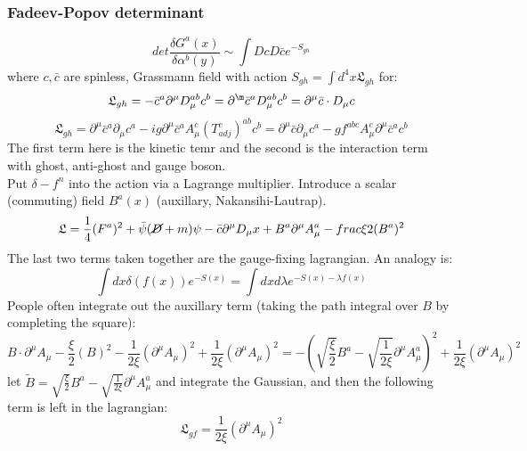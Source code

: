 \documentclass{article}
\begin{document}
       \subsubsection{Fadeev-Popov determinant}
       $$
        det \frac{\delta G^a (x)}{\delta \alpha^b(y)} \sim \int D c D \bar c e^{- S_{gh}}
       $$
       where $c, \bar c$ are spinless, Grassmann field with action $S_{gh} = \int d^4 x \mathfrak{L}_{gh}$ for:
       $$
        \mathfrak{L}_{gh} = - \bar c^a \partial^{\mu} D_{\mu}^{ab} c^b = \partial^{\m} \bar c^a D_{\mu}^{ab} c^b = \partial^{\mu} \bar c \cdot D_{\mu} c
       $$
       $$
        \mathfrak{L}_{gh} = \partial^{\mu} \bar c^a \partial_{\mu} c^a - i g \partial^{\mu} \bar c^a A_{\mu}^c ( T_{adj}^c)^{ab} c^b = \partial^{\mu} \bar c \partial_{\mu} c^a - g f^{abc} A_{\mu}^c \partial^{\mu} \bar c^a c^b
       $$
       The first term here is the kinetic temr and the second is the interaction term with ghost, anti-ghost and gauge boson.\\
       Put $\delta-f^n$ into the action via a Lagrange multiplier. Introduce a scalar (commuting) field $B^a(x)$ (auxillary, Nakansihi-Lautrap).
       $$
       \mathfrak{L} = \frac{1}{4} (F^a)^2 + \bar \psi( \cancel D + m ) \psi - \bar c \partial^{\mu} D_{\mu} x + B^a \partial^{\mu} A_{\mu}^a - frac{\xi}{2} ( B^a)^2
       $$
       The last two terms taken together are the gauge-fixing lagrangian. An analogy is:
       $$
       \int dx \delta(f(x)) e^{-S(x)} = \int dx d \lambda e^{-S(x) - \lambda f(x)}
       $$
       People often integrate out the auxillary term (taking the path integral over $B$ by completing the square):
       $$
        B \cdot \partial^{\mu} A_{\mu} - \frac{\xi}{2} ( B )^2 - \frac{1}{2\xi} (\partial^{\mu} A_{\mu})^2 + \frac{1}{2\xi} ( \partial^{\mu} A_{\mu} )^2 = - ( \sqrt{\frac{\xi}{2}} B^a - \sqrt{ \frac{1}{2\xi}} \partial^{\mu} A_{\mu}^a)^2 + \frac{1}{2\xi} ( \partial^{\mu} A_{\mu})^2
       $$
       let $\tilde B =  \sqrt{\frac{\xi}{2}} B^a - \sqrt{ \frac{1}{2\xi}} \partial^{\mu} A_{\mu}^a$  and integrate the Gaussian, and then the following term is left in the lagrangian:
       $$
        \mathfrak{L}_{gf} = \frac{1}{2\xi} ( \partial^{\mu} A_{\mu})^2
       $$
\end{document}
